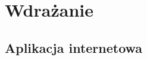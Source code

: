 \chapter{Wdrażanie} %
\label{cha:wdra_anie}

\section{Aplikacja internetowa} %
\label{sec:aplikacja_internetowa}

